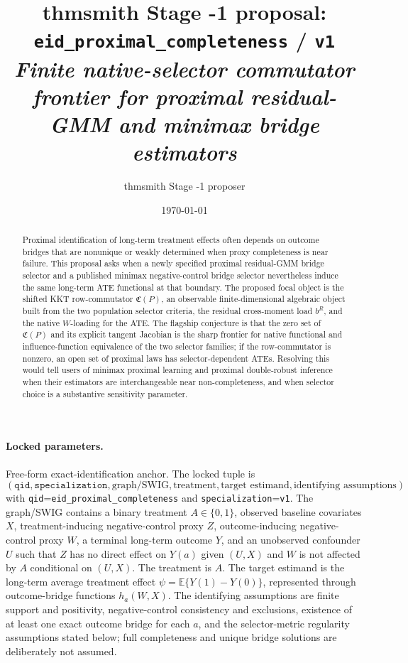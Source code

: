 \documentclass[11pt]{article}
\title{thmsmith Stage -1 proposal: \texttt{eid\_proximal\_completeness} / \texttt{v1}%
  \\ \large\textit{Finite native-selector commutator frontier for proximal residual-GMM and minimax bridge estimators}}
\author{thmsmith Stage -1 proposer}
\date{\today}
\newcommand{\E}{\mathbb{E}}
\theoremstyle{definition}
\theoremstyle{plain}
\theoremstyle{remark}
\begin{document}
\maketitle


\paragraph{Locked parameters.}
Free-form exact-identification anchor. The locked tuple is
\[
(\texttt{qid},\texttt{specialization},\text{graph/SWIG},\text{treatment},\text{target estimand},\text{identifying assumptions})
\]
with \texttt{qid}=\texttt{eid\_proximal\_completeness} and \texttt{specialization}=\texttt{v1}. The graph/SWIG contains a binary treatment \(A\in\{0,1\}\), observed baseline covariates \(X\), treatment-inducing negative-control proxy \(Z\), outcome-inducing negative-control proxy \(W\), a terminal long-term outcome \(Y\), and an unobserved confounder \(U\) such that \(Z\) has no direct effect on \(Y(a)\) given \((U,X)\) and \(W\) is not affected by \(A\) conditional on \((U,X)\). The treatment is \(A\). The target estimand is the long-term average treatment effect \(\psi=\E\{Y(1)-Y(0)\}\), represented through outcome-bridge functions \(h_a(W,X)\). The identifying assumptions are finite support and positivity, negative-control consistency and exclusions, existence of at least one exact outcome bridge for each \(a\), and the selector-metric regularity assumptions stated below; full completeness and unique bridge solutions are deliberately not assumed.

\begin{abstract}
Proximal identification of long-term treatment effects often depends on outcome bridges that are nonunique or weakly determined when proxy completeness is near failure. This proposal asks when a newly specified proximal residual-GMM bridge selector and a published minimax negative-control bridge selector nevertheless induce the same long-term ATE functional at that boundary. The proposed focal object is the shifted KKT row-commutator \(\mathfrak C(P)\), an observable finite-dimensional algebraic object built from the two population selector criteria, the residual cross-moment load \(b^R\), and the native \(W\)-loading for the ATE. The flagship conjecture is that the zero set of \(\mathfrak C(P)\) and its explicit tangent Jacobian is the sharp frontier for native functional and influence-function equivalence of the two selector families; if the row-commutator is nonzero, an open set of proximal laws has selector-dependent ATEs. Resolving this would tell users of minimax proximal learning and proximal double-robust inference when their estimators are interchangeable near non-completeness, and when selector choice is a substantive sensitivity parameter.
\end{abstract}
\end{document}
